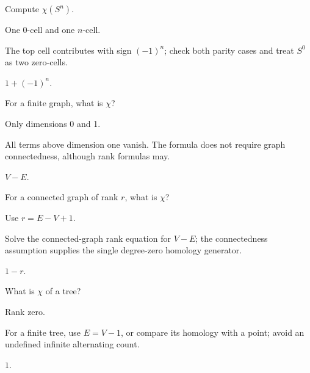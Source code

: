 \begin{exercise}\label{exr:viii21-06}
Compute \(\chi(S^n)\).
\end{exercise}
\begin{hint}
One 0-cell and one \(n\)-cell.

The top cell contributes with sign \((-1)^n\); check both parity cases and treat \(S^0\) as two zero-cells.
\end{hint}
\begin{solution}
\(1+(-1)^n\).
\end{solution}

\begin{exercise}\label{exr:viii21-07}
For a finite graph, what is \(\chi\)?
\end{exercise}
\begin{hint}
Only dimensions 0 and 1.

All terms above dimension one vanish. The formula does not require graph connectedness, although rank formulas may.
\end{hint}
\begin{solution}
\(V-E\).
\end{solution}

\begin{exercise}\label{exr:viii21-08}
For a connected graph of rank \(r\), what is \(\chi\)?
\end{exercise}
\begin{hint}
Use \(r=E-V+1\).

Solve the connected-graph rank equation for \(V-E\); the connectedness assumption supplies the single degree-zero homology generator.
\end{hint}
\begin{solution}
\(1-r\).
\end{solution}

\begin{exercise}\label{exr:viii21-09}
What is \(\chi\) of a tree?
\end{exercise}
\begin{hint}
Rank zero.

For a finite tree, use \(E=V-1\), or compare its homology with a point; avoid an undefined infinite alternating count.
\end{hint}
\begin{solution}
\(1\).
\end{solution}

